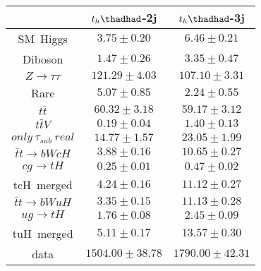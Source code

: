 \centering
\begin{tabular}{ccc} \toprule\toprule
 & $t_{h}\thadhad$-2j & $t_{h}\thadhad$-3j\\ \midrule
SM~Higgs & $3.75\pm0.20$ & $6.46\pm0.21$\\
Diboson & $1.47\pm0.26$ & $3.35\pm0.47$\\
$Z\to\tau\tau$ & $121.29\pm4.03$ & $107.10\pm3.31$\\
Rare & $5.07\pm0.85$ & $2.24\pm0.55$\\
$t\bar{t}$ & $60.32\pm3.18$ & $59.17\pm3.12$\\
$t\bar{t}V$ & $0.19\pm0.04$ & $1.40\pm0.13$\\
$only~\tau_{sub}~real$ & $14.77\pm1.57$ & $23.05\pm1.99$\\\midrule
$\bar{t}t\to bWcH$ & $3.88\pm0.16$ & $10.65\pm0.27$\\
$cg\to tH$ & $0.25\pm0.01$ & $0.47\pm0.02$\\
tcH~merged & $4.24\pm0.16$ & $11.12\pm0.27$\\
$\bar{t}t\to bWuH$ & $3.35\pm0.15$ & $11.13\pm0.28$\\
$ug\to tH$ & $1.76\pm0.08$ & $2.45\pm0.09$\\
tuH~merged & $5.11\pm0.17$ & $13.57\pm0.30$\\\midrule
data & $1504.00\pm38.78$ & $1790.00\pm42.31$\\
\bottomrule\bottomrule
\end{tabular}
